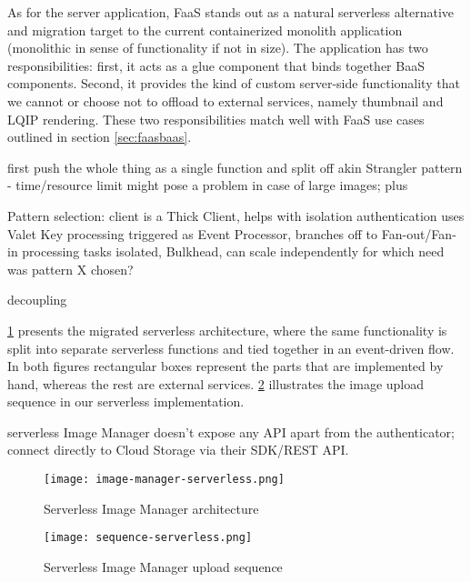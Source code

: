 As for the server application, FaaS stands out as a natural serverless alternative and migration target to the current containerized monolith application (monolithic in sense of functionality if not in size). The application has two responsibilities: first, it acts as a glue component that binds together BaaS components. Second, it provides the kind of custom server-side functionality that we cannot or choose not to offload to external services, namely thumbnail and LQIP rendering. These two responsibilities match well with FaaS use cases outlined in section \ref{sec:faasbaas}.

first push the whole thing as a single function and split off akin Strangler pattern - time/resource limit might pose a problem in case of large images; plus

Pattern selection:
client is a Thick Client, helps with isolation
authentication uses Valet Key
processing triggered as Event Processor, branches off to Fan-out/Fan-in
processing tasks isolated, Bulkhead, can scale independently
for which need was pattern X chosen?

decoupling

\ref{fig:serverlessArchitecture} presents the migrated serverless architecture, where the same functionality is split into separate serverless functions and tied together in an event-driven flow. In both figures rectangular boxes represent the parts that are implemented by hand, whereas the rest are external services. \ref{fig:serverlessSequence} illustrates the image upload sequence in our serverless implementation.

serverless Image Manager doesn't expose any API apart from the authenticator; connect directly to Cloud Storage via their SDK/REST API.


\begin{figure}[h]
  \centering
  \texttt{[image: image-manager-serverless.png]}
  \caption{Serverless Image Manager architecture}
  \label{fig:serverlessArchitecture}
\end{figure}

\begin{figure}[h]
  \centering
  \texttt{[image: sequence-serverless.png]}
  \caption{Serverless Image Manager upload sequence}
  \label{fig:serverlessSequence}
\end{figure}

